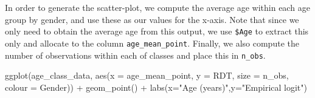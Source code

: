 \documentclass[
  letterpaper,
]{krantz}
\newenvironment{Shaded}{\begin{snugshade}}{\end{snugshade}}
\newcommand{\AttributeTok}[1]{\textcolor[rgb]{0.40,0.45,0.13}{#1}}
\newcommand{\CommentTok}[1]{\textcolor[rgb]{0.37,0.37,0.37}{#1}}
\newcommand{\FunctionTok}[1]{\textcolor[rgb]{0.28,0.35,0.67}{#1}}
\newcommand{\NormalTok}[1]{\textcolor[rgb]{0.00,0.23,0.31}{#1}}
\newcommand{\OtherTok}[1]{\textcolor[rgb]{0.00,0.23,0.31}{#1}}
\newcommand{\SpecialCharTok}[1]{\textcolor[rgb]{0.37,0.37,0.37}{#1}}
\newcommand{\StringTok}[1]{\textcolor[rgb]{0.13,0.47,0.30}{#1}}
\begin{document}
\begin{Shaded}
\end{Shaded}

In order to generate the scatter-plot, we compute the average age within
each age group by gender, and use these as our values for the x-axis.
Note that since we only need to obtain the average age from this output,
we use \texttt{\$Age} to extract this only and allocate to the column
\texttt{age\_mean\_point}. Finally, we also compute the number of
observations within each of classes and place this in \texttt{n\_obs}.

\begin{Shaded}
\begin{Highlighting}[]
\FunctionTok{ggplot}\NormalTok{(age\_class\_data, }\FunctionTok{aes}\NormalTok{(}\AttributeTok{x =}\NormalTok{ age\_mean\_point, }\AttributeTok{y =}\NormalTok{ RDT, }
                           \AttributeTok{size =}\NormalTok{ n\_obs, }
                           \AttributeTok{colour =}\NormalTok{ Gender)) }\SpecialCharTok{+} 
  \FunctionTok{geom\_point}\NormalTok{() }\SpecialCharTok{+} 
  \FunctionTok{labs}\NormalTok{(}\AttributeTok{x=}\StringTok{"Age (years)"}\NormalTok{,}\AttributeTok{y=}\StringTok{"Empirical logit"}\NormalTok{)  }
\end{Highlighting}
\end{Shaded}
\end{document}
